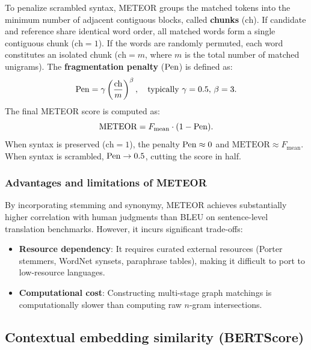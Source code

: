 \documentclass[../../../main.tex]{subfiles}
\begin{document}
To penalize scrambled syntax, METEOR groups the matched tokens into the minimum number of adjacent contiguous blocks, called \textbf{chunks} ($\text{ch}$). If candidate and reference share identical word order, all matched words form a single contiguous chunk ($\text{ch} = 1$). If the words are randomly permuted, each word constitutes an isolated chunk ($\text{ch} = m$, where $m$ is the total number of matched unigrams). The \textbf{fragmentation penalty} ($\mathrm{Pen}$) is defined as:
\begin{equation}
\label{eq:meteor_penalty}
\mathrm{Pen} = \gamma \left( \frac{\text{ch}}{m} \right)^\beta, \quad \text{typically } \gamma = 0.5, \, \beta = 3.
\end{equation}
The final METEOR score is computed as:
\begin{equation}
\label{eq:meteor_final}
\text{METEOR} = F_{\text{mean}} \cdot (1 - \mathrm{Pen}).
\end{equation}
When syntax is preserved ($\text{ch} = 1$), the penalty $\mathrm{Pen} \approx 0$ and $\text{METEOR} \approx F_{\text{mean}}$. When syntax is scrambled, $\mathrm{Pen} \to 0.5$, cutting the score in half.

\subsubsection{Advantages and limitations of METEOR}
By incorporating stemming and synonymy, METEOR achieves substantially higher correlation with human judgments than BLEU on sentence-level translation benchmarks. However, it incurs significant trade-offs:
\begin{itemize}
    \item \textbf{Resource dependency}: It requires curated external resources (Porter stemmers, WordNet synsets, paraphrase tables), making it difficult to port to low-resource languages.
    \item \textbf{Computational cost}: Constructing multi-stage graph matchings is computationally slower than computing raw $n$-gram intersections.
\end{itemize}

\subsection{Contextual embedding similarity (BERTScore)}
\label{subsec:bertscore}
\end{document}
